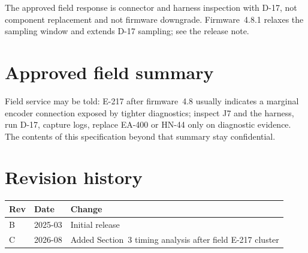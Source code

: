 \documentclass[11pt,a4paper]{article}
\begin{document}
The approved field response is connector and harness inspection with D-17, not
component replacement and not firmware downgrade. Firmware~4.8.1 relaxes the
sampling window and extends D-17 sampling; see the release note.

\section{Approved field summary}
Field service may be told: E-217 after firmware~4.8 usually indicates a
marginal encoder connection exposed by tighter diagnostics; inspect J7 and the
harness, run D-17, capture logs, replace EA-400 or HN-44 only on diagnostic
evidence. The contents of this specification beyond that summary stay
confidential.

\section{Revision history}
\begin{table}[h]
\centering
\begin{tabular}{lll}
\toprule
Rev & Date & Change \\
\midrule
B & 2025-03 & Initial release \\
C & 2026-08 & Added Section~3 timing analysis after field E-217 cluster \\
\bottomrule
\end{tabular}
\end{table}
\end{document}
